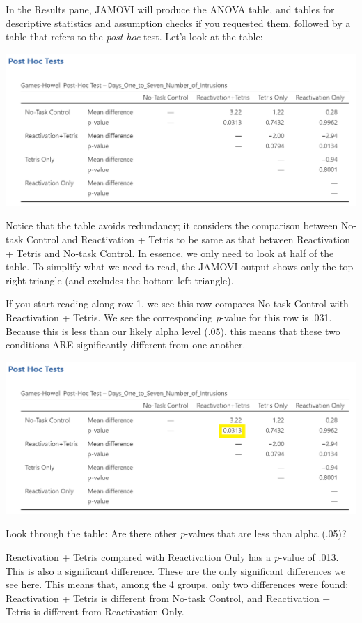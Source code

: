 \documentclass[
]{book}
\begin{document}
In the Results pane, JAMOVI will produce the ANOVA table, and tables for descriptive statistics and assumption checks if you requested them, followed by a table that refers to the \emph{post-hoc} test. Let's look at the table:

\includegraphics{img/GamesHowellPostHocTest.png}

Notice that the table avoids redundancy; it considers the comparison between No-task Control and Reactivation + Tetris to be same as that between Reactivation + Tetris and No-task Control. In essence, we only need to look at half of the table. To simplify what we need to read, the JAMOVI output shows only the top right triangle (and excludes the bottom left triangle).

If you start reading along row 1, we see this row compares No-task Control with Reactivation + Tetris. We see the corresponding \emph{p}-value for this row is .031. Because this is less than our likely alpha level (.05), this means that these two conditions ARE significantly different from one another.

\includegraphics{img/GamesHowellPostHocTest_SigPValue.png}

Look through the table: Are there other \emph{p}-values that are less than alpha (.05)?

Reactivation + Tetris compared with Reactivation Only has a \emph{p}-value of .013. This is also a significant difference. These are the only significant differences we see here. This means that, among the 4 groups, only two differences were found: Reactivation + Tetris is different from No-task Control, and Reactivation + Tetris is different from Reactivation Only.
\end{document}
